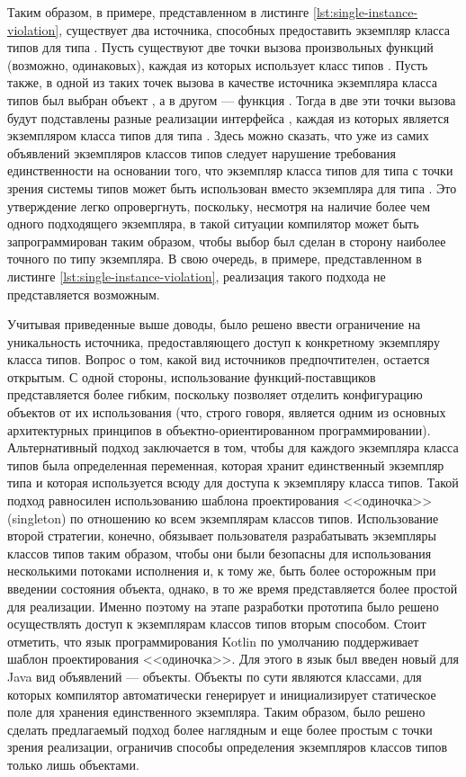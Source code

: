 Таким образом, в примере, представленном в листинге \ref{lst:single-instance-violation}, существует два источника, способных предоставить экземпляр класса типов  для типа . Пусть существуют две точки вызова произвольных функций (возможно, одинаковых), каждая из которых использует класс типов . Пусть также, в одной из таких точек вызова в качестве источника экземпляра класса типов был выбран объект , а в другом --- функция . Тогда в две эти точки вызова будут подставлены разные реализации интерфейса , каждая из которых является экземпляром класса типов  для типа . Здесь можно сказать, что уже из самих объявлений экземпляров классов типов следует нарушение требования единственности на основании того, что экземпляр класса типов  для типа  с точки зрения системы типов может быть использован вместо экземпляра для типа . Это утверждение легко опровергнуть, поскольку, несмотря на наличие более чем одного подходящего экземпляра, в такой ситуации компилятор может быть запрограммирован таким образом, чтобы выбор был сделан в сторону наиболее точного по типу экземпляра. В свою очередь, в примере, представленном в листинге \ref{lst:single-instance-violation}, реализация такого подхода не представляется возможным.   

Учитывая приведенные выше доводы, было решено ввести ограничение на уникальность источника, предоставляющего доступ к конкретному экземпляру класса типов. Вопрос о том, какой вид источников предпочтителен, остается открытым. С одной стороны, использование функций-поставщиков представляется более гибким, поскольку позволяет отделить конфигурацию объектов от их использования (что, строго говоря, является одним из основных архитектурных принципов в объектно-ориентированном программировании). Альтернативный подход заключается в том, чтобы для каждого экземпляра класса типов была определенная переменная, которая хранит единственный экземпляр типа и которая используется всюду для доступа к экземпляру класса типов. Такой подход равносилен использованию шаблона проектирования <<одиночка>> (singleton) по отношению ко всем экземплярам классов типов. Использование второй стратегии, конечно, обязывает пользователя разрабатывать экземпляры классов типов таким образом, чтобы они были безопасны для использования несколькими потоками исполнения и, к тому же, быть более осторожным при введении состояния объекта, однако, в то же время представляется более простой для реализации. Именно поэтому на этапе разработки прототипа было решено осуществлять доступ к экземплярам классов типов вторым способом. Стоит отметить, что язык программирования Kotlin по умолчанию поддерживает шаблон проектирования <<одиночка>>. Для этого в язык был введен новый для Java вид объявлений --- объекты. Объекты по сути являются классами, для которых компилятор автоматически генерирует и инициализирует статическое поле для хранения единственного экземпляра. Таким образом, было решено сделать предлагаемый подход более наглядным и еще более простым с точки зрения реализации, ограничив способы определения экземпляров классов типов только лишь объектами. 

